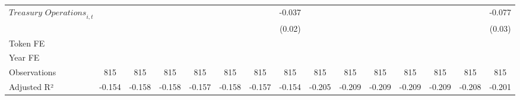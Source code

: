 {\begin{tabular}{l*{14}{c}}
$\textit{Treasury Operations}_{i,t}$&                     &                     &                     &                     &                     &                     &      -0.037\sym{*}  &                     &                     &                     &                     &                     &                     &      -0.077\sym{**} \\
                    &                     &                     &                     &                     &                     &                     &      (0.02)         &                     &                     &                     &                     &                     &                     &      (0.03)         \\
\midrule
Token FE            &                     &                     &                     &                     &                     &                     &                     &                     &                     &                     &                     &                     &                     &                     \\
Year FE             &                     &                     &                     &                     &                     &                     &                     &                     &                     &                     &                     &                     &                     &                     \\
Observations        &         815         &         815         &         815         &         815         &         815         &         815         &         815         &         815         &         815         &         815         &         815         &         815         &         815         &         815         \\
Adjusted R²         &      -0.154         &      -0.158         &      -0.158         &      -0.157         &      -0.158         &      -0.157         &      -0.154         &      -0.205         &      -0.209         &      -0.209         &      -0.209         &      -0.209         &      -0.208         &      -0.201         \\
\bottomrule
\end{tabular}
}
